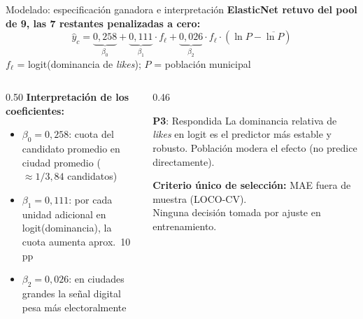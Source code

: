 \begin{frame}{Modelado: especificación ganadora e interpretación}
  \textbf{ElasticNet retuvo  del pool de 9, las 7 restantes penalizadas a cero:}
  \[
    \hat{y}_c = \underbrace{0{,}258}_{\beta_0}
    + \underbrace{0{,}111}_{\beta_1} \cdot f_{\ell}
    + \underbrace{0{,}026}_{\beta_2} \cdot f_{\ell} \cdot (\ln\!P - \overline{\ln P})
  \]
  {\small $f_{\ell}$ = logit(dominancia de \textit{likes}); $P$ = población municipal}

  \vspace{0.3em}
  \begin{columns}[T]
    \begin{column}{0.50\textwidth}
      \textbf{Interpretación de los coeficientes:}
      \begin{itemize}\small
        \item $\beta_0 = 0{,}258$: cuota del candidato promedio en ciudad promedio
              ($\approx 1/3{,}84$ candidatos)
        \item $\beta_1 = 0{,}111$: por cada unidad adicional en logit(dominancia),
              la cuota aumenta aprox.\ 10 pp
        \item $\beta_2 = 0{,}026$: en ciudades grandes la señal digital
              pesa más electoralmente
      \end{itemize}
    \end{column}
    \begin{column}{0.46\textwidth}
      \begin{exampleblock}{\textbf{P3}: Respondida}
        \small La dominancia relativa de \textit{likes} en logit es el predictor
        más estable y robusto. Población modera el efecto (no predice directamente).
      \end{exampleblock}
      \vspace{0.3em}
      {\small\textbf{Criterio único de selección:}
      MAE fuera de muestra (LOCO-CV).\\
      Ninguna decisión tomada por ajuste en entrenamiento.}
    \end{column}
  \end{columns}
\end{frame}

\addtocounter{framenumber}{1}

\addtocounter{framenumber}{1}

\addtocounter{framenumber}{1}

